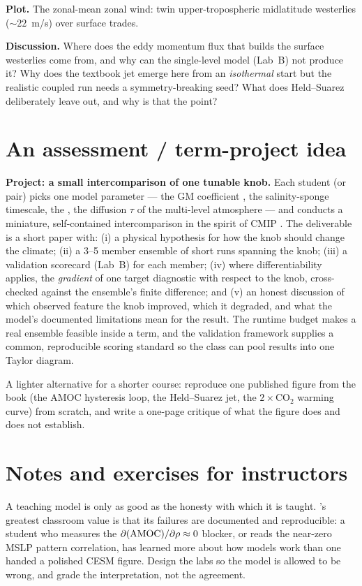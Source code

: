 \textbf{Plot.} The zonal-mean zonal wind: twin upper-tropospheric midlatitude westerlies
($\sim22$~m/s) over surface trades.

\textbf{Discussion.} Where does the eddy momentum flux that builds the surface westerlies come
from, and why can the single-level model (Lab~B) not produce it? Why does the textbook jet emerge
here from an \emph{isothermal} start but the realistic coupled run needs a symmetry-breaking seed?
What does Held--Suarez deliberately leave out, and why is that the point?

\section{An assessment / term-project idea}
\label{sec:teach-project}

\textbf{Project: a small intercomparison of one tunable knob.} Each student (or pair) picks one
model parameter --- the GM coefficient , the salinity-sponge timescale, the
, the diffusion $\tau$ of the multi-level atmosphere --- and conducts a
miniature, self-contained intercomparison in the spirit of CMIP \citep{eyring2016cmip6}. The
deliverable is a short paper with: (i) a physical hypothesis for how the knob should change the
climate; (ii) a 3--5 member ensemble of short runs spanning the knob; (iii) a validation scorecard
(Lab~B) for each member; (iv) where differentiability applies, the \emph{gradient} of one target
diagnostic with respect to the knob, cross-checked against the ensemble's finite difference; and
(v) an honest discussion of which observed feature the knob improved, which it degraded, and what
the model's documented limitations mean for the result. The runtime budget makes a real ensemble
feasible inside a term, and the validation framework supplies a common, reproducible scoring
standard so the class can pool results into one Taylor diagram.

A lighter alternative for a shorter course: reproduce one published figure from the book
(the AMOC hysteresis loop, the Held--Suarez jet, the $2\times$CO$_2$ warming curve) from scratch,
and write a one-page critique of what the figure does and does not establish.

\section{Notes and exercises for instructors}

A teaching model is only as good as the honesty with which it is taught. \model{}'s greatest
classroom value is that its failures are documented and reproducible: a student who measures the
$\partial(\text{AMOC})/\partial\rho\approx0$ blocker, or reads the near-zero MSLP pattern
correlation, has learned more about how models work than one handed a polished CESM figure. Design
the labs so the model is allowed to be wrong, and grade the interpretation, not the agreement.

